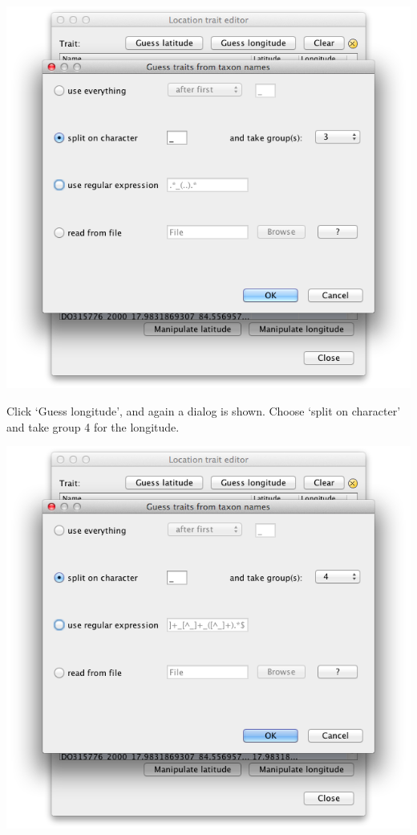 \documentclass{article}
\begin{document}
\includegraphics[scale=0.4]{figures/BEAUti_geography4.png}

Click `Guess longitude', and again a dialog is shown. Choose `split on character' and take group 4 for the longitude.

\includegraphics[scale=0.4]{figures/BEAUti_geography5.png}
\end{document}
